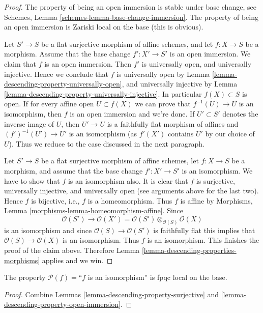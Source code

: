 \begin{proof}
The property of being an open immersion is stable under base change,
see Schemes, Lemma \ref{schemes-lemma-base-change-immersion}.
The property of being an open immersion is Zariski local on the base
(this is obvious).

\medskip\noindent
Let $S' \to S$ be a flat surjective morphism of affine schemes,
and let $f : X \to S$ be a morphism. Assume that the base change
$f' : X' \to S'$ is an open immersion. We claim that $f$ is an
open immersion.
Then $f'$ is universally open, and universally injective.
Hence we conclude that $f$ is universally open by
Lemma \ref{lemma-descending-property-universally-open}, and
universally injective by
Lemma \ref{lemma-descending-property-universally-injective}.
In particular $f(X) \subset S$ is open. If for every affine
open $U \subset f(X)$ we can prove that $f^{-1}(U) \to U$
is an isomorphism, then $f$ is an open immersion and we're done.
If $U' \subset S'$ denotes the inverse image of $U$,
then $U' \to U$ is a faithfully flat morphism of affines and
$(f')^{-1}(U') \to U'$ is an isomorphism (as $f'(X')$ contains $U'$
by our choice of $U$). Thus we reduce to the case discussed
in the next paragraph.

\medskip\noindent
Let $S' \to S$ be a flat surjective morphism of affine schemes,
let $f : X \to S$ be a morphism, and assume that the base change
$f' : X' \to S'$ is an isomorphism. We have to show that $f$ is an
isomorphism also. It is clear that $f$ is surjective, universally injective,
and universally open (see arguments above for the last two).
Hence $f$ is bijective, i.e., $f$ is a homeomorphism.
Thus $f$ is affine by
Morphisms, Lemma \ref{morphisms-lemma-homeomorphism-affine}.
Since
$$
\mathcal{O}(S') \to
\mathcal{O}(X') =
\mathcal{O}(S') \otimes_{\mathcal{O}(S)} \mathcal{O}(X)
$$
is an isomorphism and since $\mathcal{O}(S) \to \mathcal{O}(S')$
is faithfully flat this implies that $\mathcal{O}(S) \to \mathcal{O}(X)$
is an isomorphism. Thus $f$ is an isomorphism. This finishes the proof of
the claim above.
Therefore Lemma \ref{lemma-descending-properties-morphisms} applies and we win.
\end{proof}

\begin{lemma}
\label{lemma-descending-property-isomorphism}
The property $\mathcal{P}(f) =$``$f$ is an isomorphism''
is fpqc local on the base.
\end{lemma}

\begin{proof}
Combine Lemmas \ref{lemma-descending-property-surjective}
and \ref{lemma-descending-property-open-immersion}.
\end{proof}

